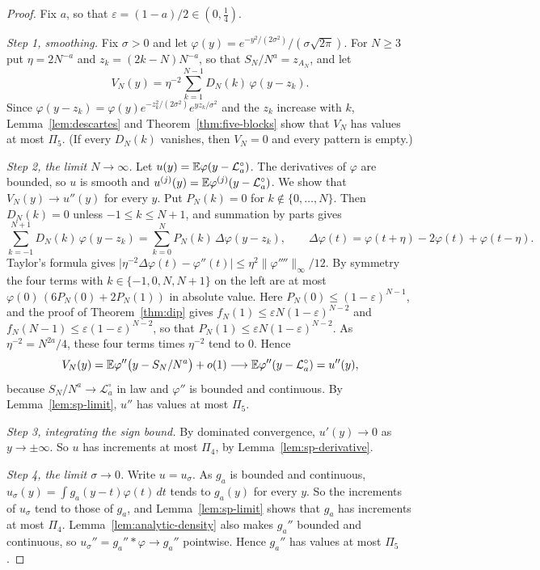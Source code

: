 \begin{proof}
Fix $a$, so that $\varepsilon=(1-a)/2\in(0,\frac14)$.

\emph{Step 1, smoothing.} Fix $\sigma>0$ and let
$\varphi(y)=e^{-y^2/(2\sigma^2)}/(\sigma\sqrt{2\pi})$. For $N\ge3$ put
$\eta=2N^{-a}$ and $z_k=(2k-N)N^{-a}$, so that $S_N/N^a=z_{A_N}$, and let
\[
 V_N(y)=\eta^{-2}\sum_{k=1}^{N-1}D_N(k)\,\varphi(y-z_k).
\]
Since $\varphi(y-z_k)=\varphi(y)e^{-z_k^2/(2\sigma^2)}e^{yz_k/\sigma^2}$ and
the $z_k$ increase with $k$, Lemma~\ref{lem:descartes} and
Theorem~\ref{thm:five-blocks} show that $V_N$ has values at most $\Pi_5$. (If
every $D_N(k)$ vanishes, then $V_N=0$ and every pattern is empty.)

\emph{Step 2, the limit $N\to\infty$.} Let $u(y)=\mathbb{E}\varphi(y-\mathcal L^\circ_a)$.
The derivatives of $\varphi$ are bounded, so $u$ is smooth and
$u^{(j)}(y)=\mathbb{E}\varphi^{(j)}(y-\mathcal L^\circ_a)$. We show that
$V_N(y)\to u''(y)$ for every $y$. Put $P_N(k)=0$ for $k\notin\{0,\dots,N\}$.
Then $D_N(k)=0$ unless $-1\le k\le N+1$, and summation by parts gives
\[
 \sum_{k=-1}^{N+1}D_N(k)\,\varphi(y-z_k)=\sum_{k=0}^NP_N(k)\,\Delta\varphi(y-z_k),
 \qquad \Delta\varphi(t)=\varphi(t+\eta)-2\varphi(t)+\varphi(t-\eta).
\]
Taylor's formula gives
$\lvert\eta^{-2}\Delta\varphi(t)-\varphi''(t)\rvert\le\eta^2\lVert\varphi''''\rVert_\infty/12$.
By symmetry the four terms with $k\in\{-1,0,N,N+1\}$ on the left are at most
$\varphi(0)\,(6P_N(0)+2P_N(1))$ in absolute value. Here
$P_N(0)\le(1-\varepsilon)^{N-1}$, and the proof of Theorem~\ref{thm:dip} gives
$f_N(1)\le\varepsilon N(1-\varepsilon)^{N-2}$ and
$f_N(N-1)\le\varepsilon(1-\varepsilon)^{N-2}$, so that
$P_N(1)\le\varepsilon N(1-\varepsilon)^{N-2}$. As $\eta^{-2}=N^{2a}/4$,
these four terms times $\eta^{-2}$ tend to $0$. Hence
\[
 V_N(y)=\mathbb{E}\varphi''\bigl(y-S_N/N^a\bigr)+o(1)\longrightarrow
 \mathbb{E}\varphi''(y-\mathcal L^\circ_a)=u''(y),
\]
because $S_N/N^a\to\mathcal L^\circ_a$ in law and $\varphi''$ is bounded and
continuous. By Lemma~\ref{lem:sp-limit}, $u''$ has values at most $\Pi_5$.

\emph{Step 3, integrating the sign bound.} By dominated convergence, $u'(y)\to0$ as
$y\to\pm\infty$. So $u$ has increments at most $\Pi_4$, by
Lemma~\ref{lem:sp-derivative}.

\emph{Step 4, the limit $\sigma\to0$.} Write $u=u_\sigma$. As $g_a$ is bounded
and continuous, $u_\sigma(y)=\int g_a(y-t)\varphi(t)\,dt$ tends to $g_a(y)$ for
every $y$. So the increments of $u_\sigma$ tend to those of $g_a$, and
Lemma~\ref{lem:sp-limit} shows that $g_a$ has increments at most $\Pi_4$.
Lemma~\ref{lem:analytic-density} also makes $g_a''$ bounded and continuous,
so $u_\sigma''=g_a''*\varphi\to g_a''$ pointwise. Hence $g_a''$ has
values at most $\Pi_5$.


\end{proof}
